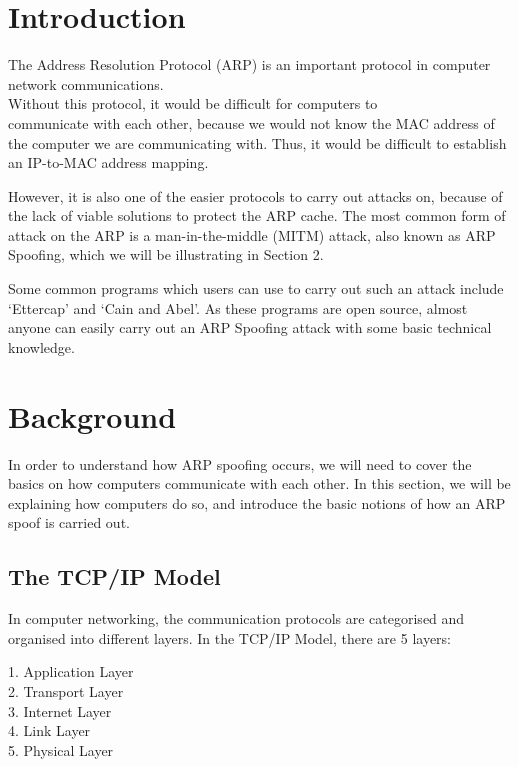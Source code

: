 \documentclass{acm_proc_article-sp}
\begin{document}


\section{Introduction}
The Address Resolution Protocol (ARP) is an important protocol in computer network communications. \\ Without this protocol, it would be difficult for computers to \\communicate with each other, because we would not know the MAC address of the computer we are communicating with. Thus, it would be difficult to establish an IP-to-MAC address mapping.

However, it is also one of the easier protocols to carry out attacks on, because of the lack of viable solutions to protect the ARP cache. The most common form of attack on the ARP is a man-in-the-middle (MITM) attack, also known as ARP Spoofing, which we will be illustrating in Section 2. 

Some common programs which users can use to carry out such an attack include `Ettercap' and `Cain and Abel'. As these programs are open source, almost anyone can easily carry out an ARP Spoofing attack with some basic technical knowledge. 

\section{Background}
In order to understand how ARP spoofing occurs, we will need to cover the basics on how computers communicate with each other. In this section, we will be explaining how computers do so, and introduce the basic notions of how an ARP spoof is carried out. 

\subsection{The TCP/IP Model}
In computer networking, the communication protocols are categorised and organised into different layers. In the TCP/IP Model, there are 5 layers: 

1. Application Layer\\
2. Transport Layer\\
3. Internet Layer\\
4. Link Layer\\
5. Physical Layer\\
\end{document}

